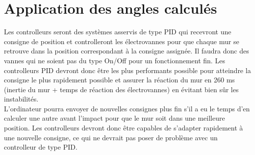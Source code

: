 \section{Application des angles calculés}

Les controlleurs seront des systèmes asservis de type PID qui recevront une consigne de position et controlleront les électrovannes pour que chaque mur se retrouve dans la position correspondant à la consigne assignée. Il faudra donc des vannes qui ne soient pas du type On/Off pour un fonctionnement fin. Les controlleurs PID devront donc être les plus performants possible pour atteindre la consigne le plus rapidement possible et assurer la réaction du mur en 260 ms (inertie du mur + temps de réaction des électrovannes) en évitant bien sûr les instabilités.\\
L'ordinateur pourra envoyer de nouvelles consignes plus fin s'il a eu le temps d'en calculer une autre avant l'impact pour que le mur soit dans une meilleure position. Les controlleurs devront donc être capables de s'adapter rapidement à une nouvelle consigne, ce qui ne devrait pas poser de problème avec un controlleur de type PID.

